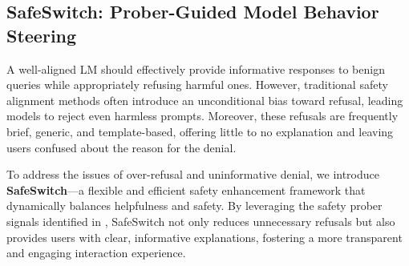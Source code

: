 

\subsection{SafeSwitch: Prober-Guided Model Behavior Steering}
\label{sec:steering}


A well-aligned LM should effectively provide informative responses to benign queries while appropriately refusing harmful ones. However, traditional safety alignment methods often introduce an unconditional bias toward refusal, leading models to reject even harmless prompts. Moreover, these refusals are frequently brief, generic, and template-based, offering little to no explanation and leaving users confused about the reason for the denial.

To address the issues of over-refusal and uninformative denial, we introduce \textbf{SafeSwitch}—a flexible and efficient safety enhancement framework that dynamically balances helpfulness and safety. By leveraging the safety prober signals identified in , SafeSwitch not only reduces unnecessary refusals but also provides users with clear, informative explanations, fostering a more transparent and engaging interaction experience.

